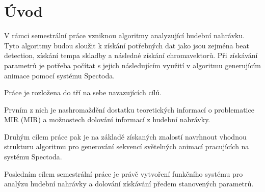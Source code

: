 \chapter*{Úvod}
{}

V rámci semestrální práce vzniknou algoritmy analyzující hudební nahrávku.
Tyto algoritmy budou sloužit k získání potřebných dat jako jsou zejména beat detection,
získání tempa skladby a následné získání chromavektorů.
Při získávání parametrů je potřeba počítat s jejich následujícím využití v algoritmu generujícím animace pomocí systému Spectoda. 
\bigskip

Práce je rozložena do tří na sebe navazujících cílů.

Prvním z nich je nashromaždění dostatku teoretických informací o problematice \acs{MIR} (\acl{MIR})
a možnostech dolování informací z hudební nahrávky.

Druhým cílem práce pak je na základě získaných znalostí navrhnout vhodnou strukturu algoritmu pro generování sekvencí světelných animací pracujících na systému Spectoda.

Posledním cílem semestrální práce je právě vytvoření funkčního systému pro analýzu hudební nahrávky a dolování získávání předem stanovených parametrů.
